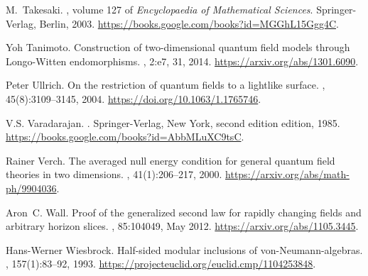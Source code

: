 \documentclass[12pt]{article}
\theoremstyle{remark}
\begin{document}
{\begin{thebibliography}{KLLSM18}
M.~Takesaki.
, volume 127 of {\em
  Encyclopaedia of Mathematical Sciences}.
\newblock Springer-Verlag, Berlin, 2003.
\newblock \url{https://books.google.com/books?id=MGGhL15Ggg4C}.

Yoh Tanimoto.
\newblock Construction of two-dimensional quantum field models through
  {L}ongo-{W}itten endomorphisms.
, 2:e7, 31, 2014.
\newblock \url{https://arxiv.org/abs/1301.6090}.

Peter Ullrich.
\newblock On the restriction of quantum fields to a lightlike surface.
, 45(8):3109--3145, 2004.
\newblock \url{https://doi.org/10.1063/1.1765746}.

V.S. Varadarajan.
.
\newblock Springer-Verlag, New York, second edition edition, 1985.
\newblock \url{https://books.google.com/books?id=AbbMLuXC9tsC}.

Rainer Verch.
\newblock The averaged null energy condition for general quantum field theories
  in two dimensions.
, 41(1):206--217, 2000.
\newblock \url{https://arxiv.org/abs/math-ph/9904036}.

Aron~C. Wall.
\newblock Proof of the generalized second law for rapidly changing fields and
  arbitrary horizon slices.
, 85:104049, May 2012.
\newblock \url{https://arxiv.org/abs/1105.3445}.

Hans-Werner Wiesbrock.
\newblock Half-sided modular inclusions of von-{N}eumann-algebras.
, 157(1):83--92, 1993.
\newblock \url{https://projecteuclid.org/euclid.cmp/1104253848}.

\end{thebibliography}}
\end{document}
